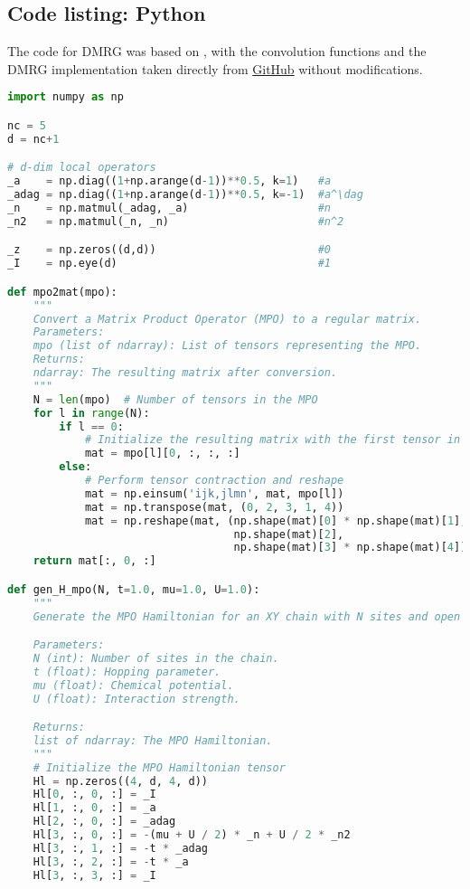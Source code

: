 \begin{widetext}
\section{Code listing: Python} \label{app:codesP}

The code for DMRG was based on \cite{catarina_density-matrix_2023}, with the convolution functions and the DMRG implementation taken directly from \href{https://github.com/GCatarina/DMRG_MPS_didactic/blob/main/DMRG-MPS_implementation.ipynb}{GitHub} without modifications.
\begin{lstlisting}[language=Python]
import numpy as np

nc = 5
d = nc+1

# d-dim local operators
_a    = np.diag((1+np.arange(d-1))**0.5, k=1)   #a
_adag = np.diag((1+np.arange(d-1))**0.5, k=-1)  #a^\dag
_n    = np.matmul(_adag, _a)                    #n
_n2   = np.matmul(_n, _n)                       #n^2

_z    = np.zeros((d,d))                         #0
_I    = np.eye(d)                               #1

def mpo2mat(mpo):
    """
    Convert a Matrix Product Operator (MPO) to a regular matrix.
    Parameters:
    mpo (list of ndarray): List of tensors representing the MPO.
    Returns:
    ndarray: The resulting matrix after conversion.
    """
    N = len(mpo)  # Number of tensors in the MPO
    for l in range(N):
        if l == 0:
            # Initialize the resulting matrix with the first tensor in the MPO
            mat = mpo[l][0, :, :, :]
        else:
            # Perform tensor contraction and reshape
            mat = np.einsum('ijk,jlmn', mat, mpo[l])
            mat = np.transpose(mat, (0, 2, 3, 1, 4))
            mat = np.reshape(mat, (np.shape(mat)[0] * np.shape(mat)[1],
                                   np.shape(mat)[2],
                                   np.shape(mat)[3] * np.shape(mat)[4]))
    return mat[:, 0, :]

def gen_H_mpo(N, t=1.0, mu=1.0, U=1.0):    
    """
    Generate the MPO Hamiltonian for an XY chain with N sites and open boundary conditions.

    Parameters:
    N (int): Number of sites in the chain.
    t (float): Hopping parameter.
    mu (float): Chemical potential.
    U (float): Interaction strength.

    Returns:
    list of ndarray: The MPO Hamiltonian.
    """
    # Initialize the MPO Hamiltonian tensor
    Hl = np.zeros((4, d, 4, d))
    Hl[0, :, 0, :] = _I
    Hl[1, :, 0, :] = _a
    Hl[2, :, 0, :] = _adag
    Hl[3, :, 0, :] = -(mu + U / 2) * _n + U / 2 * _n2
    Hl[3, :, 1, :] = -t * _adag
    Hl[3, :, 2, :] = -t * _a
    Hl[3, :, 3, :] = _I
    

\end{lstlisting}
\end{widetext}

